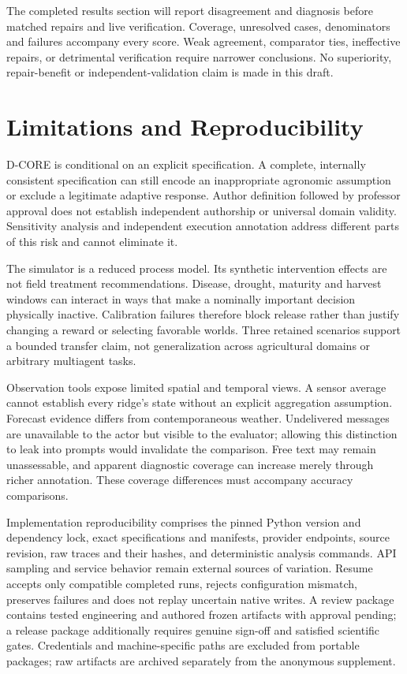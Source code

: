 \documentclass[sigconf,anonymous]{aamas}
\begin{document}
The completed results section will report disagreement and diagnosis before matched repairs and live verification. Coverage, unresolved cases, denominators and failures accompany every score. Weak agreement, comparator ties, ineffective repairs, or detrimental verification require narrower conclusions. No superiority, repair-benefit or independent-validation claim is made in this draft.

\section{Limitations and Reproducibility}
D-CORE is conditional on an explicit specification. A complete, internally consistent specification can still encode an inappropriate agronomic assumption or exclude a legitimate adaptive response. Author definition followed by professor approval does not establish independent authorship or universal domain validity. Sensitivity analysis and independent execution annotation address different parts of this risk and cannot eliminate it.

The simulator is a reduced process model. Its synthetic intervention effects are not field treatment recommendations. Disease, drought, maturity and harvest windows can interact in ways that make a nominally important decision physically inactive. Calibration failures therefore block release rather than justify changing a reward or selecting favorable worlds. Three retained scenarios support a bounded transfer claim, not generalization across agricultural domains or arbitrary multiagent tasks.

Observation tools expose limited spatial and temporal views. A sensor average cannot establish every ridge's state without an explicit aggregation assumption. Forecast evidence differs from contemporaneous weather. Undelivered messages are unavailable to the actor but visible to the evaluator; allowing this distinction to leak into prompts would invalidate the comparison. Free text may remain unassessable, and apparent diagnostic coverage can increase merely through richer annotation. These coverage differences must accompany accuracy comparisons.

Implementation reproducibility comprises the pinned Python version and dependency lock, exact specifications and manifests, provider endpoints, source revision, raw traces and their hashes, and deterministic analysis commands. API sampling and service behavior remain external sources of variation. Resume accepts only compatible completed runs, rejects configuration mismatch, preserves failures and does not replay uncertain native writes. A review package contains tested engineering and authored frozen artifacts with approval pending; a release package additionally requires genuine sign-off and satisfied scientific gates. Credentials and machine-specific paths are excluded from portable packages; raw artifacts are archived separately from the anonymous supplement.
\end{document}
